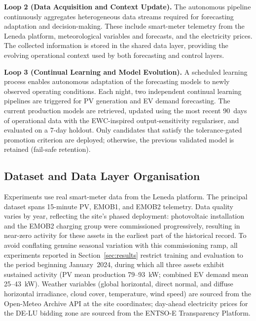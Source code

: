\documentclass[journal]{IEEEtran}
\begin{document}
\textbf{Loop 2 (Data Acquisition and Context Update).}
The autonomous pipeline continuously aggregates heterogeneous data
streams required for forecasting adaptation and decision-making. These
include smart-meter telemetry from the Leneda platform, meteorological
variables and forecasts, and the electricity prices.
The collected information is stored in the shared data layer, providing
the evolving operational context used by both forecasting and control
layers.

\textbf{Loop 3 (Continual Learning and Model Evolution).}
A scheduled learning process enables autonomous adaptation of the
forecasting models to newly observed operating conditions. Each night,
two independent continual learning pipelines are triggered for PV
generation and EV demand forecasting. The current production models are
retrieved, updated using the most recent 90~days of operational data with
the EWC-inspired output-sensitivity regulariser, and evaluated
on a 7-day holdout. Only candidates that satisfy the tolerance-gated
promotion criterion are deployed; otherwise, the previous validated
model is retained (fail-safe retention).
\subsection{Dataset and Data Layer Organisation}
\label{sec:dataset}

Experiments use real smart-meter data from the Leneda platform. The
principal dataset spans 15-minute PV, EMOB1, and EMOB2 telemetry.
Data quality varies by year, reflecting the site's phased deployment:
photovoltaic installation and the EMOB2 charging group were
commissioned progressively, resulting in near-zero activity for these
assets in the earliest part of the historical record. To avoid
conflating genuine seasonal variation with this commissioning ramp,
all experiments reported in Section~\ref{sec:results} restrict training
and evaluation to the period beginning January~2024, during which all
three assets exhibit sustained activity (PV mean production 79--93~kW;
combined EV demand mean 25--43~kW). Weather variables (global
horizontal, direct normal, and diffuse horizontal irradiance, cloud
cover, temperature, wind speed) are sourced from the Open-Meteo Archive
API at the site coordinates; day-ahead electricity prices for the
DE-LU bidding zone are sourced from the ENTSO-E Transparency Platform.
\end{document}
